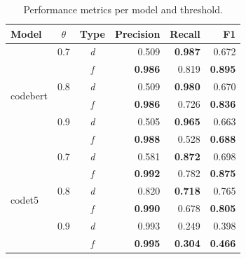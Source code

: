 \begin{table}[tb]
\centering
\footnotesize
\caption{Performance metrics per model and threshold.}
\begin{tabular}{lccrrr}
\hline
\textbf{Model} & \textbf{$\theta$} & \textbf{Type} & \textbf{Precision} & \textbf{Recall} & \textbf{F1} \\
\hline
\multirow{6}{*}{codebert} & 0.7 & \textit{d} & 0.509 & \textbf{0.987} & 0.672 \\
& & \textit{f} & \textbf{0.986} & 0.819 & \textbf{0.895} \\
 & 0.8 & \textit{d} & 0.509 & \textbf{0.980} & 0.670 \\
& & \textit{f} & \textbf{0.986} & 0.726 & \textbf{0.836} \\
 & 0.9 & \textit{d} & 0.505 & \textbf{0.965} & 0.663 \\
& & \textit{f} & \textbf{0.988} & 0.528 & \textbf{0.688} \\
\multirow{6}{*}{codet5} & 0.7 & \textit{d} & 0.581 & \textbf{0.872} & 0.698 \\
& & \textit{f} & \textbf{0.992} & 0.782 & \textbf{0.875} \\
 & 0.8 & \textit{d} & 0.820 & \textbf{0.718} & 0.765 \\
& & \textit{f} & \textbf{0.990} & 0.678 & \textbf{0.805} \\
 & 0.9 & \textit{d} & 0.993 & 0.249 & 0.398 \\
& & \textit{f} & \textbf{0.995} & \textbf{0.304} & \textbf{0.466} \\
\hline
\end{tabular}
\label{tab:RQ3}
\end{table}